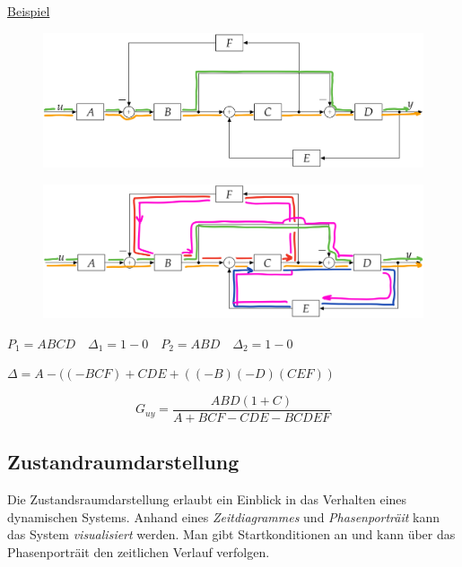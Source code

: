 \documentclass[
  10pt,
  a4paper,
  onecolumn]{article}
\numberwithin{equation}{section}
\begin{document}
\ul{Beispiel}

\begin{figure}[H]

{\centering \includegraphics{images/paste-9.png}

}

\end{figure}

\begin{figure}[H]

{\centering \includegraphics{images/paste-10.png}

}

\end{figure}

\(P_1 = ABCD \quad \Delta_1 = 1-0\quad P_2 = ABD \quad \Delta_2=1-0\)

\(\Delta=A-((-BCF)+CDE+((-B)(-D)(CEF))\)

\[
G_{uy}=\frac{ABD(1+C)}{A+BCF-CDE-BCDEF}
\]

\hypertarget{zustandraumdarstellung}{%
\subsection{Zustandraumdarstellung}\label{zustandraumdarstellung}}

Die Zustandsraumdarstellung erlaubt ein Einblick in das Verhalten eines
dynamischen Systems. Anhand eines \emph{Zeitdiagrammes} und
\emph{Phasenporträit} kann das System \emph{visualisiert} werden. Man
gibt Startkonditionen an und kann über das Phasenporträit den zeitlichen
Verlauf verfolgen.
\end{document}
